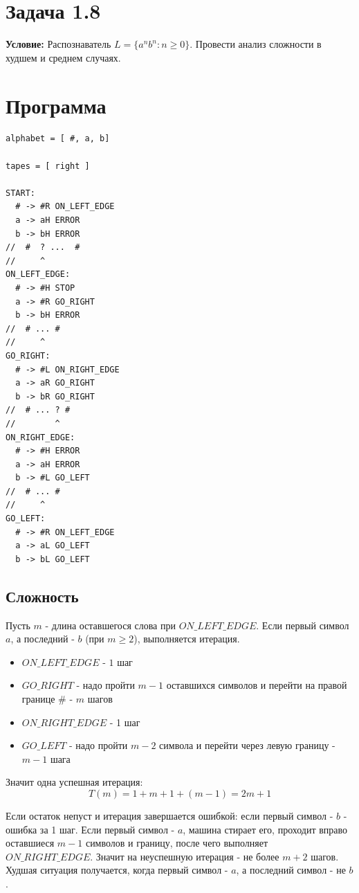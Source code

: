 \documentclass[12pt]{article}
\begin{document}
\section*{Задача 1.8}

\textbf{Условие:} Распознаватель $L=\{a^n b^n:n\geq 0\}$. Провести анализ сложности
в худшем и среднем случаях.

\section*{Программа}

\begin{verbatim}
alphabet = [ #, a, b]

tapes = [ right ]

START:
  # -> #R ON_LEFT_EDGE
  a -> aH ERROR
  b -> bH ERROR
//  #  ? ...  #
//     ^
ON_LEFT_EDGE:
  # -> #H STOP
  a -> #R GO_RIGHT
  b -> bH ERROR
//  # ... #
//     ^
GO_RIGHT:
  # -> #L ON_RIGHT_EDGE
  a -> aR GO_RIGHT
  b -> bR GO_RIGHT
//  # ... ? #
//        ^
ON_RIGHT_EDGE:
  # -> #H ERROR
  a -> aH ERROR
  b -> #L GO_LEFT
//  # ... #
//     ^
GO_LEFT:
  # -> #R ON_LEFT_EDGE
  a -> aL GO_LEFT
  b -> bL GO_LEFT
\end{verbatim}

\subsection*{Сложность}

Пусть $m$ - длина оставшегося слова при $ON\_LEFT\_EDGE$.
Если первый символ $a$, а последний - $b$
(при $m\geq 2$), выполняется итерация.

\begin{itemize}
  \item $ON\_LEFT\_EDGE$ - $1$ шаг
  \item $GO\_RIGHT$ - надо пройти $m-1$ оставшихся символов
   и перейти на правой границе $\#$ - $m$ шагов
  \item $ON\_RIGHT\_EDGE$ - 1 шаг
  \item $GO\_LEFT$ - надо пройти $m-2$ символа
  и перейти через левую границу - $m-1$ шага
\end{itemize}

Значит одна успешная итерация:
\[
  T(m)=1+m+1+(m-1)=2m+1
\]

Если остаток непуст и итерация завершается ошибкой:
если первый символ - $b$ - ошибка за 1 шаг. Если первый символ
- $a$, машина стирает его, проходит вправо оставшиеся $m-1$ символов
и границу, после чего выполняет $ON\_RIGHT\_EDGE$.
Значит на неуспешную итерация - не более $m+2$ шагов.
Худшая ситуация получается, когда первый
символ - $a$, а последний символ - не $b$.
\end{document}
